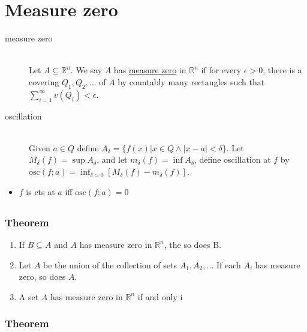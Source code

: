 \section{Measure zero}

\begin{description}
\item[measure zero] \hfill \\
	Let $A\subseteq \mathbb{R}^n$. We say $A$ has \underline{measure zero}
	in $\mathbb{R}^n$ if for every $\epsilon>0$, there is a covering $Q_1, Q_2, \dots$ of $A$
	by countably many rectangles such that
	$\sum_{i=1}^\infty v(Q_i)<\epsilon$.
\item[oscillation] \hfill \\
	Given $a\in Q$ define $A_\delta=\{f(x)|x\in Q \wedge |x-a|<\delta\}$.
	Let $M_\delta(f) = \sup A_\delta$, and let $m_\delta(f) = \inf A_\delta$,
	define oscillation at $f$ by $\mathrm{osc}(f;a)=\inf_{\delta>0}[M_\delta(f)-m_\delta(f)]$.
\end{description}

\begin{itemize}
 \item $f$ is cts at $a$ iff $\mathrm{osc}(f;a)=0$
\end{itemize}

\subsection{}
\subsubsection{Theorem }

\begin{enumerate}
  \item If $B \subseteq A$ and $A$ has measure zero in $\mathbb{R}^n$, the so does B.
  \item Let $A$ be the union of the collection of sets
        $A_1, A_2, \ldots$ If each $A_i$ has measure zero, so does $A$.
  \item A set $A$ has measure zero in $\mathbb{R}^n$ if and only i 
\end{enumerate}

\subsubsection{Theorem }



